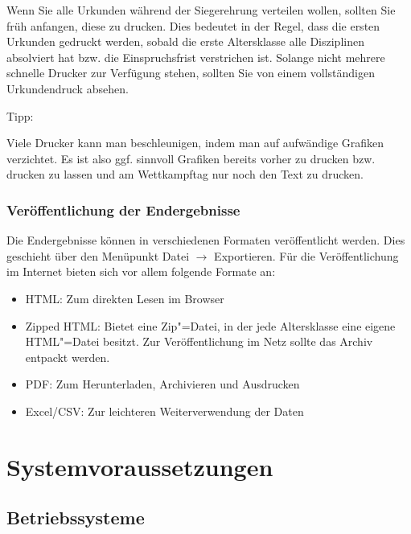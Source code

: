 \documentclass[11pt,a4paper,twoside,ngerman]{article}
\begin{document}
Wenn Sie alle Urkunden während der Siegerehrung verteilen wollen, sollten Sie früh anfangen, diese zu drucken. Dies bedeutet in der Regel, dass die ersten Urkunden gedruckt werden, sobald die erste Altersklasse alle Disziplinen absolviert hat bzw. die Einspruchsfrist verstrichen ist. Solange nicht mehrere schnelle Drucker zur Verfügung stehen, sollten Sie von einem vollständigen Urkundendruck absehen.

\begin{bfseries}Tipp:\end{bfseries} Viele Drucker kann man beschleunigen, indem man auf aufwändige Grafiken verzichtet. Es ist also ggf. sinnvoll Grafiken bereits vorher zu drucken bzw. drucken zu lassen und am Wettkampftag nur noch den Text zu drucken.


\subsubsection*{Veröffentlichung der Endergebnisse}
Die Endergebnisse können in verschiedenen Formaten veröffentlicht werden. Dies geschieht über den Menüpunkt \glqq{}Datei\grqq{} \ensuremath{\rightarrow} \glqq{}Exportieren\grqq{}. Für die Veröffentlichung im Internet bieten sich vor allem folgende Formate an:


\begin{itemize}

\item HTML: Zum direkten Lesen im Browser


\item Zipped HTML: Bietet eine Zip"=Datei, in der jede Altersklasse eine eigene HTML"=Datei besitzt. Zur Veröffentlichung im Netz sollte das Archiv entpackt werden.


\item PDF: Zum Herunterladen, Archivieren und Ausdrucken


\item Excel/CSV: Zur leichteren Weiterverwendung der Daten


\end{itemize}

\newpage

\section{Systemvoraussetzungen}
\label{lbl:system::begin}

\subsection*{Betriebssysteme}
\end{document}
